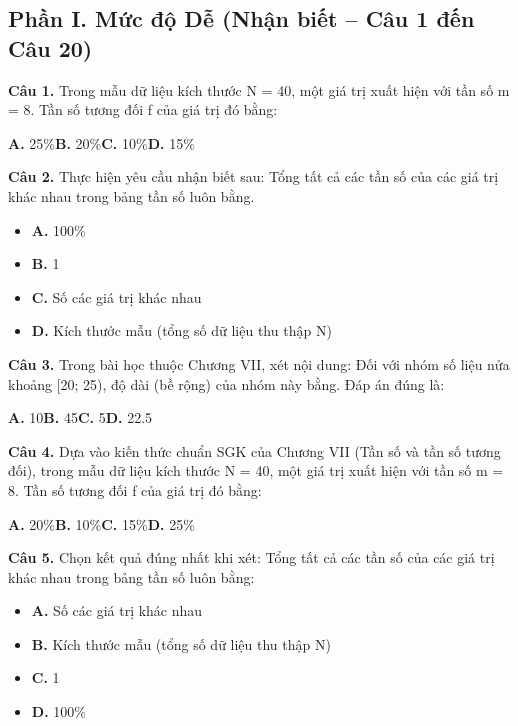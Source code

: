 \documentclass[11pt,a4paper]{article}
\begin{document}
\subsection*{\color{accent} Phần I. Mức độ Dễ (Nhận biết -- Câu 1 đến Câu 20)}
\textbf{\color{primary} Câu 1.} Trong mẫu dữ liệu kích thước N = 40, một giá trị xuất hiện với tần số m = 8. Tần số tương đối f của giá trị đó bằng:\par
\hspace*{1.5em}\textbf{A.} 25\%\quad\quad \textbf{B.} 20\%\quad\quad \textbf{C.} 10\%\quad\quad \textbf{D.} 15\%\par\vspace{2pt}
\textbf{\color{primary} Câu 2.} Thực hiện yêu cầu nhận biết sau: Tổng tất cả các tần số của các giá trị khác nhau trong bảng tần số luôn bằng.\par
\begin{itemize}\setlength{\itemsep}{1pt}\setlength{\parskip}{0pt}
  \item[] \textbf{A.} 100\%
  \item[] \textbf{B.} 1
  \item[] \textbf{C.} Số các giá trị khác nhau
  \item[] \textbf{D.} Kích thước mẫu (tổng số dữ liệu thu thập N)
\end{itemize}\vspace{2pt}
\textbf{\color{primary} Câu 3.} Trong bài học thuộc Chương VII, xét nội dung: Đối với nhóm số liệu nửa khoảng [20; 25), độ dài (bề rộng) của nhóm này bằng. Đáp án đúng là:\par
\hspace*{1.5em}\textbf{A.} 10\quad\quad \textbf{B.} 45\quad\quad \textbf{C.} 5\quad\quad \textbf{D.} 22.5\par\vspace{2pt}
\textbf{\color{primary} Câu 4.} Dựa vào kiến thức chuẩn SGK của Chương VII (Tần số và tần số tương đối), trong mẫu dữ liệu kích thước N = 40, một giá trị xuất hiện với tần số m = 8. Tần số tương đối f của giá trị đó bằng:\par
\hspace*{1.5em}\textbf{A.} 20\%\quad\quad \textbf{B.} 10\%\quad\quad \textbf{C.} 15\%\quad\quad \textbf{D.} 25\%\par\vspace{2pt}
\textbf{\color{primary} Câu 5.} Chọn kết quả đúng nhất khi xét: Tổng tất cả các tần số của các giá trị khác nhau trong bảng tần số luôn bằng:\par
\begin{itemize}\setlength{\itemsep}{1pt}\setlength{\parskip}{0pt}
  \item[] \textbf{A.} Số các giá trị khác nhau
  \item[] \textbf{B.} Kích thước mẫu (tổng số dữ liệu thu thập N)
  \item[] \textbf{C.} 1
  \item[] \textbf{D.} 100\%
\end{itemize}\vspace{2pt}
\end{document}
